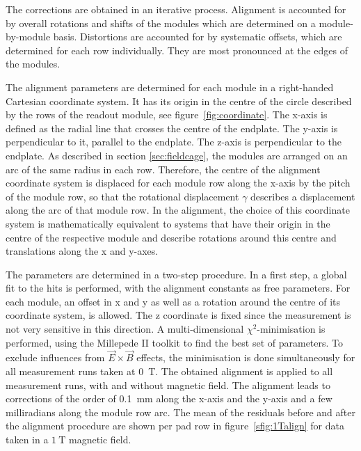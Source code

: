 \documentclass[preprint]{elsarticle}
\begin{document}
The corrections are obtained in an iterative process. Alignment is accounted for by overall rotations and shifts of the modules which are determined on a module-by-module basis. Distortions are accounted for by systematic offsets, which are determined for each row individually. They are most pronounced at the edges of the modules.

The alignment parameters are determined for each module in a right-handed Cartesian coordinate system. It has its origin in the centre of the circle described by the rows of the readout module, see figure~\ref{fig:coordinate}. The x-axis is defined as the radial line that crosses the centre of the endplate. The y-axis is perpendicular to it, parallel to the endplate. The z-axis is perpendicular to the endplate. As described in section \ref{sec:fieldcage}, the modules are arranged on an arc of the same radius in each row. Therefore, the centre of the alignment coordinate system is displaced for each module row along the x-axis by the pitch of the module row, so that the rotational displacement $\gamma$ describes a displacement along the arc of that module row. In the alignment, the choice of this coordinate system is mathematically equivalent to systems that 
have their origin in the centre of the respective module and describe rotations around this centre and translations along the x and y-axes. 

The parameters are determined in a two-step procedure. In a first step, a global fit to the hits is performed, with the alignment constants as free parameters. For each module, an offset in x and y as well as a rotation around the centre of its coordinate system, is allowed. The z coordinate is fixed since the measurement is not very sensitive in this direction. A multi-dimensional $\chi^2$-minimisation is performed, using the Millepede II toolkit to find the best set of parameters. To exclude influences from $\vec{E} \times \vec{B}$ effects, the minimisation is done simultaneously for all measurement runs taken at \SI{0}{\tesla}. 
The obtained alignment is applied to all measurement runs, with and without magnetic field. The alignment leads to corrections of the order of \SI{0.1}{\mm} along the x-axis and the y-axis and a few milliradians along the module row arc. The mean of the residuals before and after the alignment procedure are shown per pad row in figure~\ref{sfig:1Talign} for data taken in a $\SI{1}{\tesla}$ magnetic field.
\end{document}

